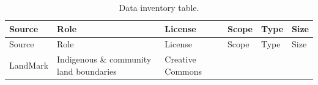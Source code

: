 \documentclass[
  letterpaper,
  DIV=11,
  numbers=noendperiod]{scrartcl}
\begin{document}
\begin{longtable}[]{@{}
  >{\raggedright\arraybackslash}p{}
  >{\raggedright\arraybackslash}p{}
  >{\raggedright\arraybackslash}p{}
  >{\raggedright\arraybackslash}p{}
  >{\raggedright\arraybackslash}p{}
  >{\raggedright\arraybackslash}p{}@{}}
\caption{Data inventory table.}\label{tbl-data-inventory}\tabularnewline
\toprule\noalign{}
\begin{minipage}[b]{\linewidth}\raggedright
Source
\end{minipage} & \begin{minipage}[b]{\linewidth}\raggedright
Role
\end{minipage} & \begin{minipage}[b]{\linewidth}\raggedright
License
\end{minipage} & \begin{minipage}[b]{\linewidth}\raggedright
Scope
\end{minipage} & \begin{minipage}[b]{\linewidth}\raggedright
Type
\end{minipage} & \begin{minipage}[b]{\linewidth}\raggedright
Size
\end{minipage} \\
\midrule\noalign{}
\endfirsthead
\toprule\noalign{}
\begin{minipage}[b]{\linewidth}\raggedright
Source
\end{minipage} & \begin{minipage}[b]{\linewidth}\raggedright
Role
\end{minipage} & \begin{minipage}[b]{\linewidth}\raggedright
License
\end{minipage} & \begin{minipage}[b]{\linewidth}\raggedright
Scope
\end{minipage} & \begin{minipage}[b]{\linewidth}\raggedright
Type
\end{minipage} & \begin{minipage}[b]{\linewidth}\raggedright
Size
\end{minipage} \\
\midrule\noalign{}
\endhead
\bottomrule\noalign{}
\endlastfoot
LandMark & Indigenous \& community land boundaries & Creative Commons

\end{longtable}
\end{document}
